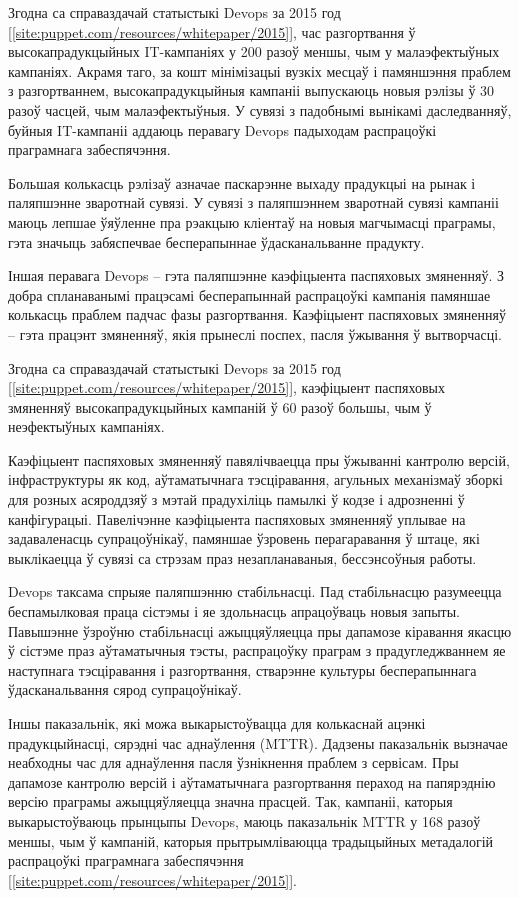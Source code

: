 Згодна са справаздачай статыстыкі Devops за 2015 год%
[\ref{site:puppet.com/resources/whitepaper/2015}],
час разгортвання ў высокапрадукцыйных IT-кампаніях у 200 разоў
меншы, чым у малаэфектыўных кампаніях.
Акрамя таго, за кошт мінімізацыі вузкіх месцаў і памяншэння
праблем з разгортваннем, высокапрадукцыйныя кампаніі
выпускаюць новыя рэлізы ў 30 разоў часцей, чым малаэфектыўныя.
У сувязі з падобнымі вынікамі даследванняў, буйныя IT-кампаніі
аддаюць перавагу Devops падыходам распрацоўкі праграмнага забеспячэння.

Большая колькасць рэлізаў азначае паскарэнне выхаду прадукцыі на рынак
і паляпшэнне зваротнай сувязі. У сувязі з паляпшэннем зваротнай сувязі
кампаніі маюць лепшае ўяўленне пра рэакцыю кліентаў на новыя магчымасці
праграмы, гэта значыць забяспечвае бесперапыннае ўдасканальванне прадукту.

Іншая перавага Devops -- гэта паляпшэнне каэфіцыента паспяховых змяненняў.
З добра спланаванымі працэсамі бесперапыннай распрацоўкі кампанія памяншае
колькасць праблем падчас фазы разгортвання.
Каэфіцыент паспяховых змяненняў -- гэта працэнт змяненняў, якія прынеслі
поспех, пасля ўжывання ў вытворчасці.

Згодна са справаздачай статыстыкі Devops за 2015 год%
[\ref{site:puppet.com/resources/whitepaper/2015}],
каэфіцыент паспяховых змяненняў высокапрадукцыйных кампаній
ў 60 разоў большы, чым ў неэфектыўных кампаніях.

Каэфіцыент паспяховых змяненняў павялічваецца пры ўжыванні
кантролю версій, інфраструктуры як код, аўтаматычнага
тэсціравання, агульных механізмаў зборкі для розных
асяроддзяў з мэтай прадухіліць памылкі ў кодзе і
адрозненні ў канфігурацыі.
Павелічэнне каэфіцыента паспяховых змяненняў
уплывае на задаваленасць супрацоўнікаў, памяншае
ўзровень перагаравання ў штаце, які выклікаецца ў сувязі са
стрэзам праз незапланаваныя, бессэнсоўныя работы.

Devops таксама спрыяе паляпшэнню стабільнасці.
Пад стабільнасцю разумеецца беспамылковая праца сістэмы і
яе здольнасць апрацоўваць новыя запыты.
Павышэнне ўзроўню стабільнасці ажыццяўляецца пры дапамозе
кіравання якасцю ў сістэме праз аўтаматычныя тэсты,
распрацоўку праграм з прадугледжваннем яе наступнага тэсціравання і
разгортвання, стварэнне культуры бесперапыннага ўдасканальвання сярод
супрацоўнікаў.

Іншы паказальнік, які можа выкарыстоўвацца для колькаснай ацэнкі
прадукцыйнасці, сярэдні час аднаўлення (MTTR). Дадзены паказальнік
вызначае неабходны час для аднаўлення пасля ўзнікнення праблем з сервісам.
Пры дапамозе кантролю версій і аўтаматычнага разгортвання пераход на
папярэднію версію праграмы ажыццяўляецца значна прасцей. Так, кампаніі,
каторыя выкарыстоўваюць прынцыпы Devops, маюць паказальнік MTTR у
168 разоў меншы, чым ў кампаній, каторыя прытрымліваюцца
традыцыйных метадалогій распрацоўкі праграмнага забеспячэння%
[\ref{site:puppet.com/resources/whitepaper/2015}].

